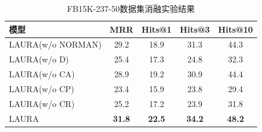 \documentclass[algorithmlist, AutoFakeBold, AutoFakeSlant, figurelist, tablelist, nomlist, engineering]{seuthesix}
\begin{document}
\begin{table}[]
  \centering
  \begin{tabular*}{0.95\textwidth}{@{\extracolsep{\fill}}lcccc}
  \toprule[1pt]
  模型 & MRR & Hits@1 & Hits@3 & Hits@10 \\ \hline
  LAURA(w/o NORMAN) & 29.2 & 18.9 & 31.3 & 44.3 \\
  LAURA(w/o D) & 25.4 & 17.3 & 24.8 & 32.3 \\
  LAURA(w/o CA) & 28.9 & 19.2 & 30.9 & 44.4 \\
  LAURA(w/o CP) & 23.4 & 15.9 & 23.8 & 29.4 \\
  LAURA(w/o CR) & 25.2 & 17.2 & 23.9 & 31.8 \\
  LAURA & \textbf{31.8} & \textbf{22.5} & \textbf{34.2} & \textbf{48.2} \\
  \bottomrule[1pt]
  \end{tabular*}
  \caption{FB15K-237-50数据集消融实验结果}
  \label{Experiment2_ablation}
\end{table}
\end{document}
